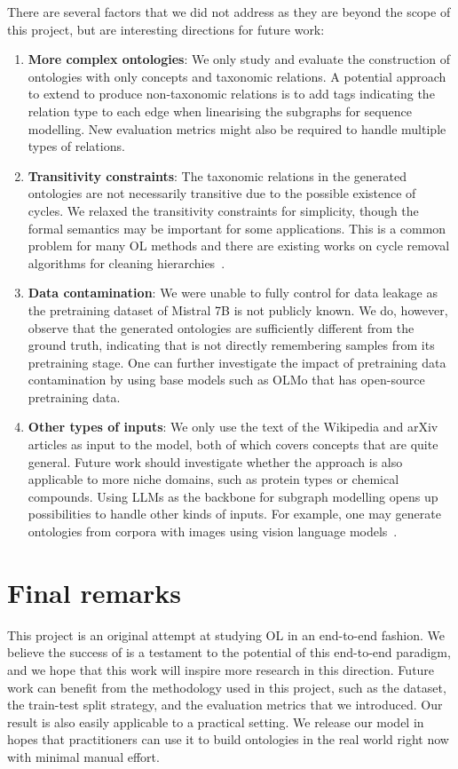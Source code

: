 There are several factors that we did not address as they are beyond the scope of this project, but are interesting directions for future work:
\begin{enumerate}
    \item \textbf{More complex ontologies}: We only study and evaluate the construction of ontologies with only concepts and taxonomic relations. A potential approach to extend \name to produce non-taxonomic relations is to add tags indicating the relation type to each edge when linearising the subgraphs for sequence modelling. New evaluation metrics might also be required to handle multiple types of relations.
    \item \textbf{Transitivity constraints}: The taxonomic relations in the generated ontologies are not necessarily transitive due to the possible existence of cycles. We relaxed the transitivity constraints for simplicity, though the formal semantics may be important for some applications. This is a common problem for many OL methods and there are existing works on cycle removal algorithms for cleaning hierarchies~\cite{sun2017breaking,zesch2007analysis}.
    \item \textbf{Data contamination}: We were unable to fully control for data leakage as the pretraining dataset of Mistral 7B is not publicly known. We do, however, observe that the generated ontologies are sufficiently different from the ground truth, indicating that \name is not directly remembering samples from its pretraining stage. One can further investigate the impact of pretraining data contamination by using base models such as OLMo \cite{OLMo} that has open-source pretraining data.
    \item \textbf{Other types of inputs}: We only use the text of the Wikipedia and arXiv articles as input to the model, both of which covers concepts that are quite general. Future work should investigate whether the approach is also applicable to more niche domains, such as protein types or chemical compounds. Using LLMs as the backbone for subgraph modelling opens up possibilities to handle other kinds of inputs. For example, one may generate ontologies from corpora with images using vision language models~\cite{donahue2015long}.
\end{enumerate}

\section{Final remarks}

This project is an original attempt at studying OL in an end-to-end fashion. We believe the success of \name is a testament to the potential of this end-to-end paradigm, and we hope that this work will inspire more research in this direction. Future work can benefit from the methodology used in this project, such as the dataset, the train-test split strategy, and the evaluation metrics that we introduced. Our result is also easily applicable to a practical setting. We release our model \name in hopes that practitioners can use it to build ontologies in the real world right now with minimal manual effort.